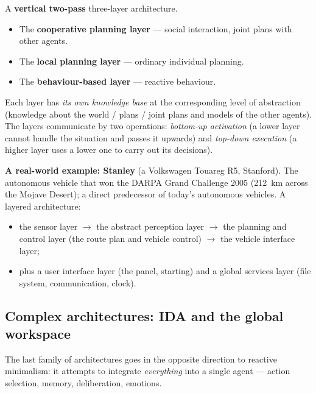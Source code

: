 \documentclass[11pt,a4paper]{article}
\theoremstyle{definition}
\begin{document}
\begin{defbox}
A \textbf{vertical two-pass} three-layer architecture.
\begin{itemize}
\item The \textbf{cooperative planning layer} --- social interaction, joint plans with other agents.
\item The \textbf{local planning layer} --- ordinary individual planning.
\item The \textbf{behaviour-based layer} --- reactive behaviour.
\end{itemize}
Each layer has \emph{its own knowledge base} at the corresponding level of abstraction (knowledge
about the world / plans / joint plans and models of the other agents). The layers communicate by two
operations: \emph{bottom-up activation} (a lower layer cannot handle the situation and passes it
upwards) and \emph{top-down execution} (a higher layer uses a lower one to carry out its decisions).
\end{defbox}

\medskip
\noindent\textbf{A real-world example: Stanley} (a Volkswagen Touareg R5, Stanford). The autonomous
vehicle that won the DARPA Grand Challenge 2005 (212~km across the Mojave Desert); a direct
predecessor of today's autonomous vehicles. A layered architecture:
\begin{itemize}
\item the sensor layer $\to$ the abstract perception layer $\to$ the planning and control layer
  (the route plan and vehicle control) $\to$ the vehicle interface layer;
\item plus a user interface layer (the panel, starting) and a global services layer (file system,
  communication, clock).
\end{itemize}

\subsection{Complex architectures: IDA and the global workspace}
\label{ssec:ida}

The last family of architectures goes in the opposite direction to reactive minimalism: it attempts
to integrate \emph{everything} into a single agent --- action selection, memory, deliberation,
emotions.
\end{document}
